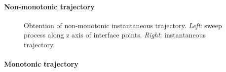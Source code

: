 
\paragraph{{Non-monotonic trajectory}}

\begin{figure}[ht]
     \centering
     \begin{subfigure}[b]{0.45\textwidth}
         \centering
     \end{subfigure}
     \begin{subfigure}[b]{0.45\textwidth}
         \centering
     \end{subfigure}
        \caption{Obtention of non-monotonic instantaneous trajectory. \textsl{Left}: sweep process along z axis of interface points. \textsl{Right}: instantaneous trajectory.}
        \label{fig:trajectory_obtention_instantaneous_method_a}
\end{figure}


\paragraph{Monotonic trajectory}


